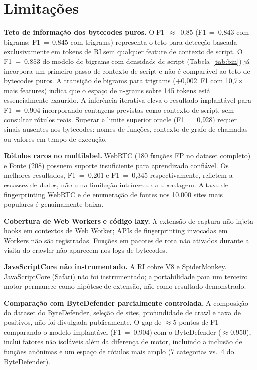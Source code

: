 \section{Limitações}
\label{sec:conclusao-limitacoes}

\textbf{Teto de informação dos bytecodes puros.} O F1~$\approx$~0,85 (F1~=~0,843
com bigrams; F1~=~0,845 com trigrams) representa o
teto para detecção baseada exclusivamente em tokens de RI sem qualquer feature de
contexto de script. O F1~=~0,853 do modelo de bigrams com densidade de script
(Tabela~\ref{tab:bin}) já incorpora um primeiro passo de contexto de
script e não é comparável ao teto de bytecodes puros. A transição de bigrams para
trigrams (+0,002~F1 com 10,7$\times$ mais features) indica que o espaço de n-grams
sobre 145 tokens está essencialmente exaurido. A inferência iterativa eleva o
resultado implantável para F1~=~0,904 incorporando contagens previstas como contexto
de script, sem consultar rótulos reais. Superar o limite superior oracle
(F1~=~0,928) requer sinais ausentes nos bytecodes: nomes de funções, contexto de
grafo de chamadas ou valores em tempo de execução.

\textbf{Rótulos raros no multilabel.} WebRTC (180 funções FP no dataset completo) e
Fonte (208) possuem suporte insuficiente para aprendizado confiável. Os melhores
resultados, F1~=~0,201 e F1~=~0,345 respectivamente, refletem a escassez de
dados, não uma limitação intrínseca da abordagem. A taxa de fingerprinting
WebRTC e de enumeração de fontes nos 10.000 sites mais populares é genuinamente
baixa.

\textbf{Cobertura de Web Workers e código lazy.} A extensão de captura não injeta
hooks em contextos de Web Worker; APIs de fingerprinting invocadas em Workers
não são registradas. Funções em pacotes de rota não ativados durante a visita do
crawler não aparecem nos logs de bytecodes.

\textbf{JavaScriptCore não instrumentado.} A RI cobre V8 e SpiderMonkey. JavaScriptCore
(Safari) não foi instrumentado; a portabilidade para um terceiro motor permanece
como hipótese de extensão, não como resultado demonstrado.

\textbf{Comparação com ByteDefender parcialmente controlada.} A composição do
dataset do ByteDefender, seleção de sites, profundidade de crawl e taxa
de positivos, não foi divulgada publicamente. O gap de $\approx$5 pontos de F1
comparando o modelo implantável (F1~=~0,904) com o ByteDefender
($\approx$0,950), inclui fatores não isoláveis além da diferença de motor,
incluindo a inclusão de funções anônimas e um espaço de rótulos mais amplo
(7 categorias vs.\ 4 do ByteDefender).

